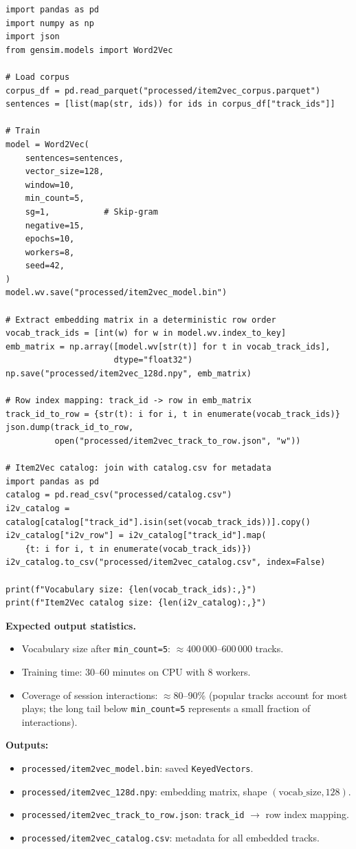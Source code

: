 \documentclass[11pt]{article}
\begin{document}
\begin{lstlisting}
import pandas as pd
import numpy as np
import json
from gensim.models import Word2Vec

# Load corpus
corpus_df = pd.read_parquet("processed/item2vec_corpus.parquet")
sentences = [list(map(str, ids)) for ids in corpus_df["track_ids"]]

# Train
model = Word2Vec(
    sentences=sentences,
    vector_size=128,
    window=10,
    min_count=5,
    sg=1,           # Skip-gram
    negative=15,
    epochs=10,
    workers=8,
    seed=42,
)
model.wv.save("processed/item2vec_model.bin")

# Extract embedding matrix in a deterministic row order
vocab_track_ids = [int(w) for w in model.wv.index_to_key]
emb_matrix = np.array([model.wv[str(t)] for t in vocab_track_ids],
                      dtype="float32")
np.save("processed/item2vec_128d.npy", emb_matrix)

# Row index mapping: track_id -> row in emb_matrix
track_id_to_row = {str(t): i for i, t in enumerate(vocab_track_ids)}
json.dump(track_id_to_row,
          open("processed/item2vec_track_to_row.json", "w"))

# Item2Vec catalog: join with catalog.csv for metadata
import pandas as pd
catalog = pd.read_csv("processed/catalog.csv")
i2v_catalog = catalog[catalog["track_id"].isin(set(vocab_track_ids))].copy()
i2v_catalog["i2v_row"] = i2v_catalog["track_id"].map(
    {t: i for i, t in enumerate(vocab_track_ids)})
i2v_catalog.to_csv("processed/item2vec_catalog.csv", index=False)

print(f"Vocabulary size: {len(vocab_track_ids):,}")
print(f"Item2Vec catalog size: {len(i2v_catalog):,}")
\end{lstlisting}

\textbf{Expected output statistics.}
\begin{itemize}
  \item Vocabulary size after \texttt{min\_count=5}: $\approx$400\,000--600\,000 tracks.
  \item Training time: 30--60 minutes on CPU with 8 workers.
  \item Coverage of session interactions: $\approx$80--90\% (popular tracks
        account for most plays; the long tail below \texttt{min\_count=5}
        represents a small fraction of interactions).
\end{itemize}

\textbf{Outputs:}
\begin{itemize}
  \item \texttt{processed/item2vec\_model.bin}: saved \texttt{KeyedVectors}.
  \item \texttt{processed/item2vec\_128d.npy}: embedding matrix,
        shape $(\text{vocab\_size}, 128)$.
  \item \texttt{processed/item2vec\_track\_to\_row.json}:
        \texttt{track\_id} $\to$ row index mapping.
  \item \texttt{processed/item2vec\_catalog.csv}:
        metadata for all embedded tracks.
\end{itemize}
\end{document}
